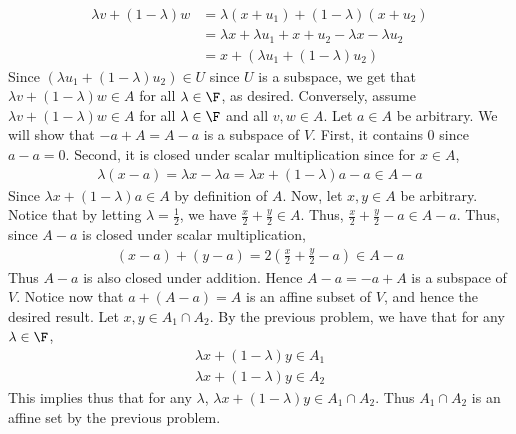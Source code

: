 \documentclass{book}
\begin{document}
\begin{enumerate}[label=\arabic*)]
\begin{align*}
        \lambda v + (1 - \lambda)w & = \lambda(x + u_1) + (1 - \lambda)(x + u_2) \\
        & = \lambda x + \lambda u_1 + x + u_2 - \lambda x - \lambda u_2 \\
        & = x + (\lambda u_1 + (1 - \lambda)u_2)
      \end{align*}
      Since $(\lambda u_1 + (1 - \lambda)u_2) \in U$ since $U$ is a subspace, we get that $\lambda v + (1 - \lambda)w \in A$ for all $\lambda \in \F$, as desired. Conversely, assume $\lambda
      v + (1 - \lambda)w \in A$ for all $\lambda \in \F$ and all $v, w \in A$. Let $a \in A$ be arbitrary. We will show that $-a + A = A - a$ is a subspace of $V$. First, it contains $0$
      since $a - a = 0$. Second, it is closed under scalar multiplication since for $x \in A$,
      \begin{align*}
        \lambda(x - a) = \lambda x - \lambda a = \lambda x + (1 - \lambda)a - a \in A - a
      \end{align*}
      Since $\lambda x + (1 - \lambda)a \in A$ by definition of $A$. Now, let $x, y \in A$ be arbitrary. Notice that by letting $\lambda = \frac{1}{2}$, we have $\frac{x}{2} +
      \frac{y}{2} \in A$. Thus, $\frac{x}{2} + \frac{y}{2} - a \in A - a$. Thus, since $A - a$ is closed under scalar multiplication,
      \begin{align*}
        (x - a) + (y - a) = 2(\frac{x}{2} + \frac{y}{2} - a) \in A - a
      \end{align*}
      Thus $A - a$ is also closed under addition. Hence $A - a = -a + A$ is a subspace of $V$. Notice now that $a + (A - a) = A$ is an affine subset of $V$, and hence the desired result.
    \ii
      Let $x, y \in A_1 \cap A_2$. By the previous problem, we have that for any $\lambda \in \F$,
      \begin{align*}
        \lambda x + (1 - \lambda)y \in A_1 \\
        \lambda x + (1 - \lambda)y \in A_2 
      \end{align*}
      This implies thus that for any $\lambda$, $\lambda x + (1 - \lambda)y \in A_1 \cap A_2$. Thus $A_1 \cap A_2$ is an affine set by the previous problem.


\end{enumerate}
\end{document}
